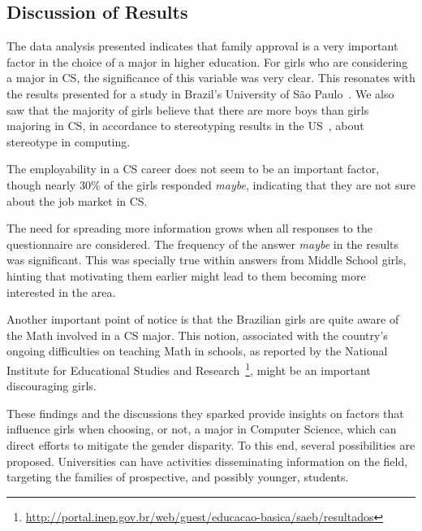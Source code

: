 \subsection{Discussion of Results}\label{sec:perception:discussion}%
The data analysis presented indicates that family approval is a very important factor in the choice of a major in higher education. For girls who are considering a major in CS, the significance of this variable was very clear. This resonates with the results presented for a study in Brazil's University of São Paulo~\cite{saboya_2009}. We also saw that the majority of girls believe that there are more boys than girls majoring in CS, in accordance to stereotyping results in the US~\cite{Mercier_2006}, about stereotype in computing.

The employability in a CS career does not seem to be an important factor, though nearly 30\% of the girls responded \emph{maybe}, indicating that they are not sure about the job market in CS. 

The need for spreading more information grows when all responses to the questionnaire are considered. The frequency of the answer \emph{maybe} in the results was significant.  This was specially true within answers from Middle School girls, hinting that motivating them earlier might lead to them becoming more interested in the area.

Another important point of notice is that the Brazilian girls are quite aware of the Math involved in a CS major. This notion, associated with the country's ongoing difficulties on teaching Math in schools, as reported by the National Institute for Educational Studies and Research~\footnote{\url{http://portal.inep.gov.br/web/guest/educacao-basica/saeb/resultados}}, might be an important discouraging girls.

These findings and the discussions they sparked provide insights on factors that influence girls when choosing, or not, a major in Computer Science, which can direct efforts to mitigate the gender disparity. To this end, several possibilities are proposed. Universities can have activities disseminating information on the field, targeting the families of prospective, and possibly younger, students.

